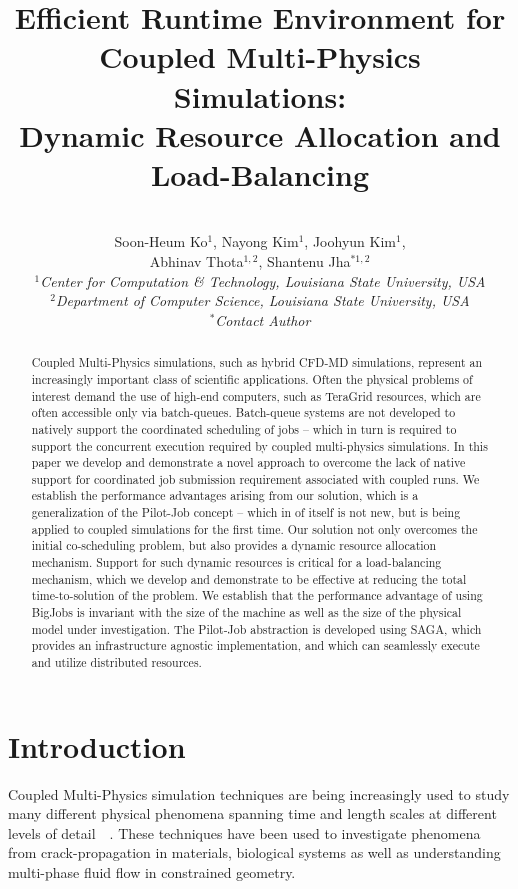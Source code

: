 \documentclass[conference,final]{IEEEtran}
\title{Efficient Runtime Environment for Coupled Multi-Physics Simulations: \\
Dynamic Resource Allocation and Load-Balancing}
\author{
 ~\\[-2em]
 Soon-Heum Ko$^{1}$, Nayong Kim$^{1}$, Joohyun Kim$^{1}$, \\ Abhinav Thota$^{1,2}$, Shantenu Jha$^{*1,2}$\\
 \small{\emph{$^{1}$Center for Computation \& Technology, Louisiana State University, USA}}\\
 \small{\emph{$^{2}$Department of Computer Science, Louisiana State University, USA}}\\
 \small{\emph{$^{*}$Contact Author}}\\
}
\newcommand{\up}{\vspace*{-1em}}
\begin{document}
\maketitle

\begin{abstract}
  Coupled Multi-Physics simulations, such as hybrid CFD-MD
  simulations, represent an increasingly important class of scientific
  applications.  Often the physical problems of interest demand the
  use of high-end computers, such as TeraGrid resources, which are
  often accessible only via batch-queues. Batch-queue systems are not
  developed to natively support the coordinated scheduling of jobs --
  which in turn is required to support the concurrent execution
  required by coupled multi-physics simulations. In this paper we
  develop and demonstrate a novel approach to overcome the lack of
  native support for coordinated job submission requirement associated
  with coupled runs. We establish the performance advantages arising
  from our solution, which is a generalization of the Pilot-Job
  concept -- which in of itself is not new, but is being applied to coupled
  simulations for the first time.  Our solution not only overcomes the
  initial co-scheduling problem, but also provides a dynamic resource
  allocation mechanism. Support for such dynamic resources is critical
  for a load-balancing mechanism, which we develop and demonstrate to
  be effective at reducing the total time-to-solution of the
  problem. We establish that the performance advantage of using
  BigJobs is invariant with the size of the machine as well as the
  size of the physical model under investigation.  The Pilot-Job
  abstraction is developed using SAGA, which provides an
  infrastructure agnostic implementation, and which can seamlessly
  execute and utilize distributed resources. 
\end{abstract}
\up\up


\section{Introduction}

Coupled Multi-Physics simulation techniques are being increasingly
used to study many different physical phenomena spanning time and
length scales at different levels of
detail~\cite{Tai}~\cite{Watanabe}. These techniques have been used to
investigate phenomena from crack-propagation in materials, biological
systems as well as understanding multi-phase fluid flow in constrained
geometry.
\end{document}
